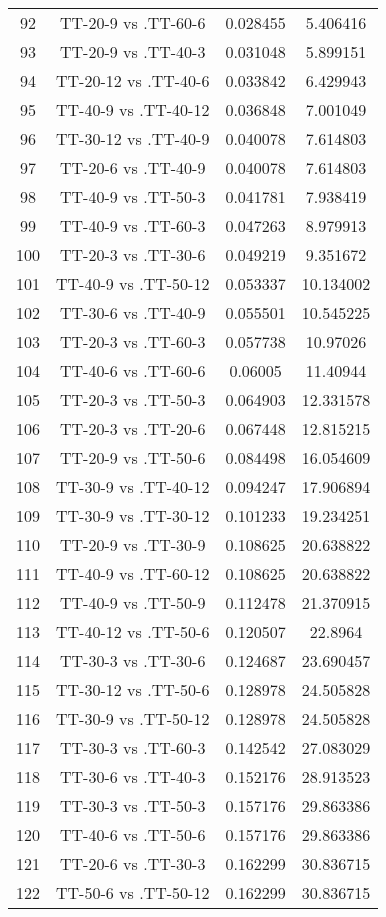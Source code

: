 \documentclass[a4paper,10pt]{article}
\begin{document}
\begin{landscape}
\begin{table}[!htp]
\begin{tabular}{cccc}
92&TT-20-9 vs .TT-60-6&0.028455&5.406416\\
93&TT-20-9 vs .TT-40-3&0.031048&5.899151\\
94&TT-20-12 vs .TT-40-6&0.033842&6.429943\\
95&TT-40-9 vs .TT-40-12&0.036848&7.001049\\
96&TT-30-12 vs .TT-40-9&0.040078&7.614803\\
97&TT-20-6 vs .TT-40-9&0.040078&7.614803\\
98&TT-40-9 vs .TT-50-3&0.041781&7.938419\\
99&TT-40-9 vs .TT-60-3&0.047263&8.979913\\
100&TT-20-3 vs .TT-30-6&0.049219&9.351672\\
101&TT-40-9 vs .TT-50-12&0.053337&10.134002\\
102&TT-30-6 vs .TT-40-9&0.055501&10.545225\\
103&TT-20-3 vs .TT-60-3&0.057738&10.97026\\
104&TT-40-6 vs .TT-60-6&0.06005&11.40944\\
105&TT-20-3 vs .TT-50-3&0.064903&12.331578\\
106&TT-20-3 vs .TT-20-6&0.067448&12.815215\\
107&TT-20-9 vs .TT-50-6&0.084498&16.054609\\
108&TT-30-9 vs .TT-40-12&0.094247&17.906894\\
109&TT-30-9 vs .TT-30-12&0.101233&19.234251\\
110&TT-20-9 vs .TT-30-9&0.108625&20.638822\\
111&TT-40-9 vs .TT-60-12&0.108625&20.638822\\
112&TT-40-9 vs .TT-50-9&0.112478&21.370915\\
113&TT-40-12 vs .TT-50-6&0.120507&22.8964\\
114&TT-30-3 vs .TT-30-6&0.124687&23.690457\\
115&TT-30-12 vs .TT-50-6&0.128978&24.505828\\
116&TT-30-9 vs .TT-50-12&0.128978&24.505828\\
117&TT-30-3 vs .TT-60-3&0.142542&27.083029\\
118&TT-30-6 vs .TT-40-3&0.152176&28.913523\\
119&TT-30-3 vs .TT-50-3&0.157176&29.863386\\
120&TT-40-6 vs .TT-50-6&0.157176&29.863386\\
121&TT-20-6 vs .TT-30-3&0.162299&30.836715\\
122&TT-50-6 vs .TT-50-12&0.162299&30.836715\\

\end{tabular}
\end{table}
\end{landscape}
\end{document}
